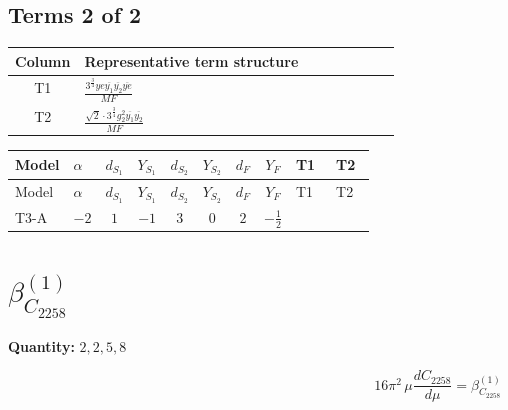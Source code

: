 \documentclass[8pt]{article}
\begin{document}
\begin{landscape}
\subsection*{Terms 2 of 2}
\begin{center}
\begin{tabular}{@{}c >{\raggedright\arraybackslash}p{0.82\linewidth}@{}}
\toprule
Column & Representative term structure \\
\midrule
T1 & \(\displaystyle \frac{3^{\frac{3}{4}} ye \overline{y_{1}} \overline{y_{2}} \overline{ye}}{MF}\) \\
\midrule
T2 & \(\displaystyle \frac{\sqrt{2} \cdot 3^{\frac{3}{4}} g_{2}^{2} \overline{y_{1}} \overline{y_{2}}}{MF}\) \\
\midrule
\bottomrule
\end{tabular}
\end{center}
\smallskip
\tiny
\begin{longtable}{@{}llcccccc >{\raggedright\arraybackslash}p{0.21\linewidth} >{\raggedright\arraybackslash}p{0.21\linewidth}@{}}
\toprule
Model & $\alpha$ & $d_{S_1}$ & $Y_{S_1}$ & $d_{S_2}$ & $Y_{S_2}$ & $d_F$ & $Y_F$ & T1 & T2 \\
\midrule
\endfirsthead
\toprule
Model & $\alpha$ & $d_{S_1}$ & $Y_{S_1}$ & $d_{S_2}$ & $Y_{S_2}$ & $d_F$ & $Y_F$ & T1 & T2 \\
\midrule
\endhead
T3-A & $-2$ & $1$ & $-1$ & $3$ & $0$ & $2$ & $-\frac{1}{2}$ & \scriptsize\adjustbox{max width=\linewidth}{$\begin{gathered} - \frac{3^{\frac{3}{4}} ye \overline{y_{1}} \overline{y_{2}} \overline{ye}}{12 MF}\end{gathered}$} & \scriptsize\adjustbox{max width=\linewidth}{$\begin{gathered} \frac{\sqrt{2} \cdot 3^{\frac{3}{4}} g_{2}^{2} \overline{y_{1}} \overline{y_{2}}}{3 MF}\end{gathered}$} \\
\midrule
\bottomrule
\end{longtable}
\clearpage
\section*{$\beta_{C_{2258}}^{(1)}$}
\noindent\textbf{Quantity: }$\mathrm{2,2,5,8}$\par\smallskip
\[16\pi^2\,\mu\frac{d C_{2258}}{d\mu}=\beta_{C_{2258}}^{(1)}\]

\end{landscape}
\end{document}
